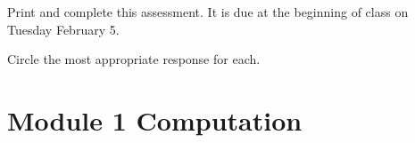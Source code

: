 \documentclass[12pt]{exam}
\begin{document}
\begin{center}
\end{center}
\vspace{0.1in}

\vspace{12pt}

Print and complete this assessment. It is due at the beginning of class on
Tuesday February 5.

\vspace{1em}

Circle the most appropriate response for each.

\section*{Module 1 Computation}
\end{document}
